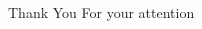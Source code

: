 \STANDARD{}
{
  \begin{columns}
    \begin{column}{0.35\textwidth}
      \begin{block}{~~~~~~Thank You}
        \centering
        For your attention
      \end{block}
    \end{column}
  \end{columns}
}


